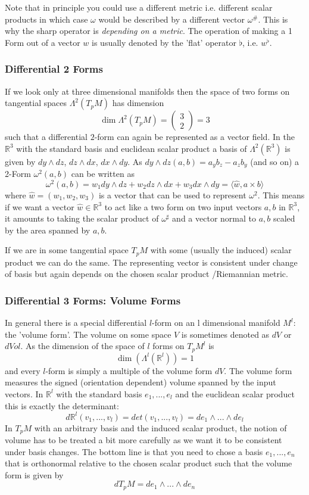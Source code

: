Note that in principle you could use a different metric i.e. different scalar products in which case $\omega$ would be described by a different vector $\omega^{\#}$. This is why the sharp operator is \emph{depending on a metric}. The operation of making a 1 Form out of a vector $w$ is usually denoted by the 'flat' operator $\flat$, i.e. $w^\flat$.

\subsubsection*{Differential 2 Forms}
If we look only at three dimensional manifolds then the space of two forms on tangential spaces $\Lambda^2(T_pM)$ has dimension \[\dim\Lambda^2(T_pM) =\begin{pmatrix}
3\\
2
\end{pmatrix} =3\] such that a differential $2$-form can again be represented as a vector field. In the $\mathbb R^3$ with the standard basis and euclidean scalar product a basis of $\Lambda^2(\mathbb R^3)$ is given by $dy \wedge dz$, $dz \wedge dx$, $dx \wedge dy$. As $dy \wedge dz (a,b) = a_yb_z -a_zb_y$ (and so on) a 2-Form $\omega^2(a,b)$ can be written as
\[\omega^2(a,b) = w_1 dy \wedge dz + w_2 dz \wedge dx + w_3 dx \wedge dy = \langle \widehat{w}, a \times b \rangle\] 
where $\widehat{w} = (w_1,w_2,w_3)$ is a vector that can be used to represent $\omega^2$. This means if we want a vector $\widehat{w} \in \mathbb R^3$ to act like a two form on two input vectors $a,b$ in $\mathbb R^3$, it amounts to taking the scalar product of $\omega^\sharp$ and a vector normal to $a,b$ scaled by the area spanned by $a,b$.

If we are in some tangential space $T_pM$ with some (usually the induced) scalar product we can do the same. The representing vector is consistent under change of basis  but again depends on the chosen scalar product /Riemannian metric.


\subsubsection*{Differential 3 Forms: Volume Forms}
In general there is a special differential $l$-form on an l dimensional manifold $M^l$: the 'volume form'. The volume on some space $V$ is sometimes denoted as $dV$ or $dVol$. As the dimension of the space of $l$ forms on $T_pM^l$ is
\[\dim(\Lambda^l(\mathbb R^l)) = 1\]
and every $l$-form is simply a multiple of the volume form $dV$. The volume form measures the signed (orientation dependent) volume spanned by the input vectors. In $\mathbb R^l$ with the standard basis $e_1,...,e_l$ and the euclidean scalar product this is exactly the determinant:
\[d\mathbb R^l (v_1,..., v_l) = det(v_1,...,v_l) = de_1\wedge ...\wedge d e_l\]
In $T_p M$ with an arbitrary basis and the induced scalar product, the notion of volume has to be treated a bit more carefully as we want it to be consistent under basis changes. The bottom line is that you need to chose a basis $e_1,...,e_n$ that is orthonormal relative to the chosen scalar product such that the volume form is given by
\[dT_pM = de_1 \wedge ... \wedge de_n\]

